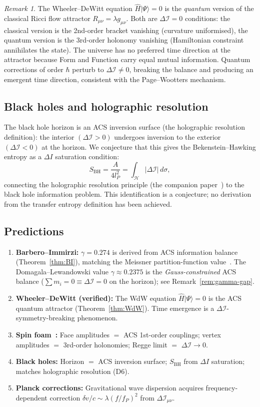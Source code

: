\documentclass[11pt,a4paper]{article}
\theoremstyle{plain}
\theoremstyle{definition}
\theoremstyle{remark}
\newtheorem{remark}[theorem]{Remark}
\newcommand{\DI}{\Delta\mathcal{I}}
\begin{document}
\begin{remark}
The Wheeler--DeWitt equation $\hat{H}|\Psi\rangle = 0$ is the
\emph{quantum} version of the classical Ricci flow attractor
$R_{\mu\nu} = \lambda g_{\mu\nu}$.  Both are $\DI = 0$ conditions:
the classical version is the 2nd-order bracket vanishing
(curvature uniformised), the quantum version is the 3rd-order
holonomy vanishing (Hamiltonian constraint annihilates the state).
The universe has no preferred time direction at the attractor because
Form and Function carry equal mutual information.
Quantum corrections of order $\hbar$ perturb to $\DI \neq 0$,
breaking the balance and producing an emergent time direction,
consistent with the Page--Wootters mechanism.
\end{remark}

\subsection{Black holes and holographic resolution}

The black hole horizon is an ACS inversion surface (the holographic resolution definition):
the interior $(\DI > 0)$ undergoes inversion to the exterior $(\DI < 0)$ at the horizon.
We conjecture that this gives the Bekenstein--Hawking entropy as a $\Delta I$ saturation condition:
\[
  S_{\text{BH}} = \frac{A}{4l_P^2} = \int_\mathcal{H} |\DI| \,d\sigma,
\]
connecting the holographic resolution principle (the companion paper~\cite{Wallace2026c})
to the black hole information problem.  This identification is a conjecture;
no derivation from the transfer entropy definition has been achieved.

\subsection{Predictions}

\begin{enumerate}[label=(P\arabic*)]
  \item \textbf{Barbero--Immirzi:} $\gamma = 0.274$ is derived from
    ACS information balance (Theorem~\ref{thm:BI}), matching the
    Meissner partition-function value~\cite{Meissner2004}.
    The Domagala--Lewandowski value $\gamma \approx 0.2375$ is the
    \emph{Gauss-constrained} ACS balance ($\sum m_i = 0 \equiv \DI = 0$
    on the horizon); see Remark~\ref{rem:gamma-gap}.
  \item \textbf{Wheeler--DeWitt (verified):} The WdW equation $\hat{H}|\Psi\rangle = 0$
    is the ACS quantum attractor (Theorem~\ref{thm:WdW}).  Time emergence is a
    $\DI$-symmetry-breaking phenomenon.
  \item \textbf{Spin foam~\cite{EPRL2008}:} Face amplitudes $=$ ACS 1st-order couplings;
    vertex amplitudes $=$ 3rd-order holonomies; Regge limit $=$ $\DI \to 0$.
  \item \textbf{Black holes:} Horizon $=$ ACS inversion surface; $S_{\text{BH}}$
    from $\Delta I$ saturation; matches holographic resolution (D6).
  \item \textbf{Planck corrections:} Gravitational wave dispersion acquires
    frequency-dependent correction $\delta v/c \sim \lambda (f/f_P)^2$ from $\DI_{\mu\nu}$.
\end{enumerate}
\end{document}

